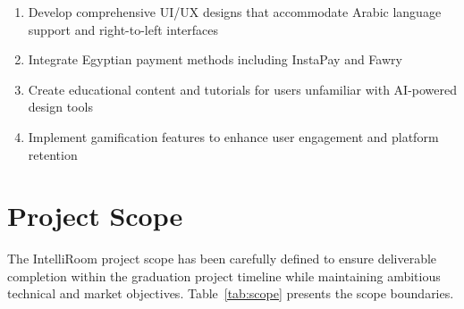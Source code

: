 \begin{enumerate}
    \item Develop comprehensive UI/UX designs that accommodate Arabic language support and right-to-left interfaces
    \item Integrate Egyptian payment methods including InstaPay and Fawry
    \item Create educational content and tutorials for users unfamiliar with AI-powered design tools
    \item Implement gamification features to enhance user engagement and platform retention
\end{enumerate}

\section{Project Scope}
\label{sec:scope}

The IntelliRoom project scope has been carefully defined to ensure deliverable completion within the graduation project timeline while maintaining ambitious technical and market objectives. Table~\ref{tab:scope} presents the scope boundaries.


